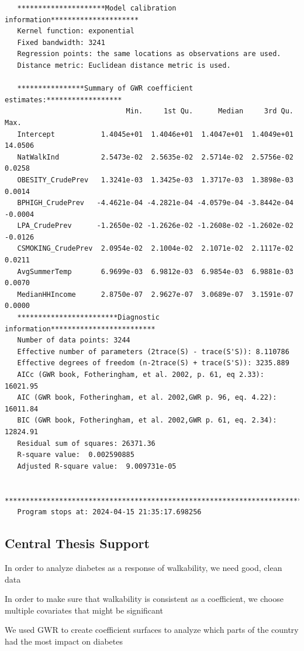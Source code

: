 \documentclass[
]{article}
\begin{document}
\begin{verbatim}
   *********************Model calibration information*********************
   Kernel function: exponential 
   Fixed bandwidth: 3241 
   Regression points: the same locations as observations are used.
   Distance metric: Euclidean distance metric is used.

   ****************Summary of GWR coefficient estimates:******************
                             Min.     1st Qu.      Median     3rd Qu.    Max.
   Intercept           1.4045e+01  1.4046e+01  1.4047e+01  1.4049e+01 14.0506
   NatWalkInd          2.5473e-02  2.5635e-02  2.5714e-02  2.5756e-02  0.0258
   OBESITY_CrudePrev   1.3241e-03  1.3425e-03  1.3717e-03  1.3898e-03  0.0014
   BPHIGH_CrudePrev   -4.4621e-04 -4.2821e-04 -4.0579e-04 -3.8442e-04 -0.0004
   LPA_CrudePrev      -1.2650e-02 -1.2626e-02 -1.2608e-02 -1.2602e-02 -0.0126
   CSMOKING_CrudePrev  2.0954e-02  2.1004e-02  2.1071e-02  2.1117e-02  0.0211
   AvgSummerTemp       6.9699e-03  6.9812e-03  6.9854e-03  6.9881e-03  0.0070
   MedianHHIncome      2.8750e-07  2.9627e-07  3.0689e-07  3.1591e-07  0.0000
   ************************Diagnostic information*************************
   Number of data points: 3244 
   Effective number of parameters (2trace(S) - trace(S'S)): 8.110786 
   Effective degrees of freedom (n-2trace(S) + trace(S'S)): 3235.889 
   AICc (GWR book, Fotheringham, et al. 2002, p. 61, eq 2.33): 16021.95 
   AIC (GWR book, Fotheringham, et al. 2002,GWR p. 96, eq. 4.22): 16011.84 
   BIC (GWR book, Fotheringham, et al. 2002,GWR p. 61, eq. 2.34): 12824.91 
   Residual sum of squares: 26371.36 
   R-square value:  0.002590885 
   Adjusted R-square value:  9.009731e-05 

   ***********************************************************************
   Program stops at: 2024-04-15 21:35:17.698256 
\end{verbatim}

\subsection{Central Thesis Support}\label{central-thesis-support-2}

In order to analyze diabetes as a response of walkability, we need good,
clean data

In order to make sure that walkability is consistent as a coefficient,
we choose multiple covariates that might be significant

We used GWR to create coefficient surfaces to analyze which parts of the
country had the most impact on diabetes
\end{document}
